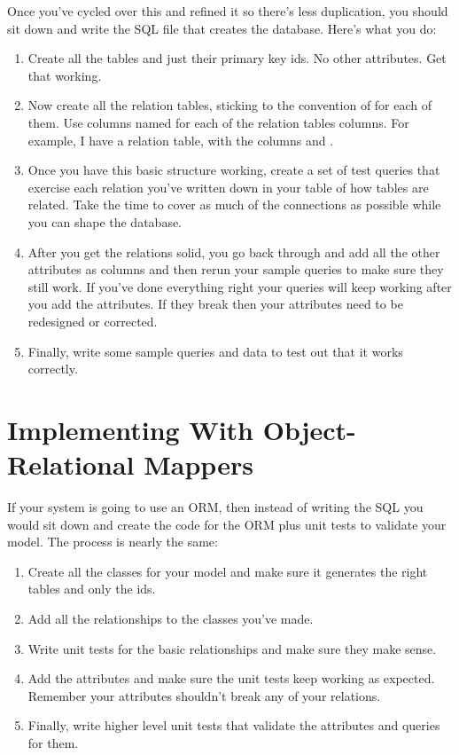 Once you've cycled over this and refined it so there's less duplication, you should sit
down and write the SQL file that creates the database.  Here's what you do:

\begin{enumerate}
\item Create all the tables and just their primary key ids.  No other attributes.  Get that
    working.
\item Now create all the relation tables, sticking to the convention of 
    for each of them.  Use columns named  for each of the relation tables
    columns.  For example, I have a  relation table, with the columns
     and .
\item Once you have this basic structure working, create a set of test queries that exercise
    each relation you've written down in your table of how tables are related.  Take the time
    to cover as much of the connections as possible while you can shape the database.
\item After you get the relations solid, you go back through and add all the other attributes
    as columns and then rerun your sample queries to make sure they still work.  If you've
    done everything right your queries will keep working after you add the attributes.  If they
    break then your attributes need to be redesigned or corrected.
\item Finally, write some sample queries and data to test out that it works correctly.
\end{enumerate}


\section{Implementing With Object-Relational Mappers}

If your system is going to use an ORM, then instead of writing the SQL you would sit down and 
create the code for the ORM plus unit tests to validate your model.  The process is nearly
the same:

\begin{enumerate}
\item Create all the classes for your model and make sure it generates the right tables and
    only the ids.
\item Add all the relationships to the classes you've made.
\item Write unit tests for the basic relationships and make sure they make sense.
\item Add the attributes and make sure the unit tests keep working as expected.  Remember your attributes
    shouldn't break any of your relations.
\item Finally, write higher level unit tests that validate the attributes and queries for them.
\end{enumerate}


